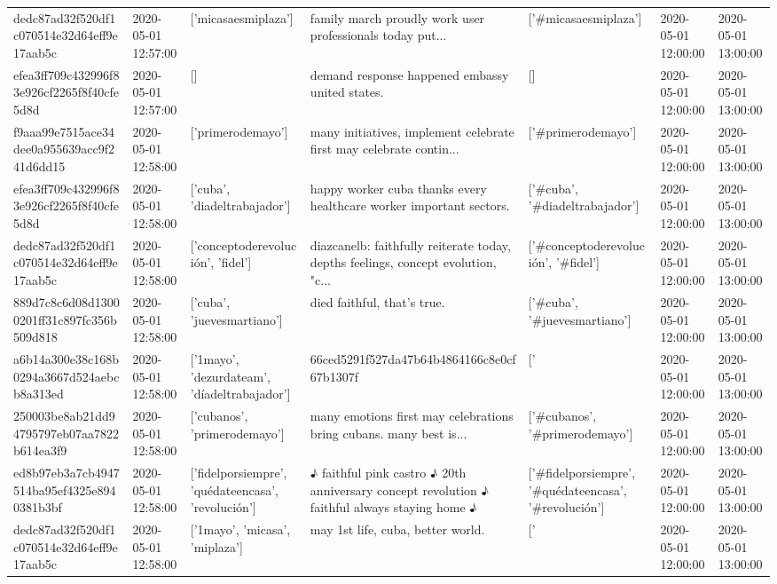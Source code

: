 \begin{tabular}{lllllll}
dedc87ad32f520df1c070514e32d64eff9e17aab5c & 2020-05-01 12:57:00 & ['micasaesmiplaza'] & family march proudly work user professionals today put... & ['#micasaesmiplaza'] & 2020-05-01 12:00:00 & 2020-05-01 13:00:00 \\
efea3ff709c432996f83e926cf2265f8f40cfe5d8d & 2020-05-01 12:57:00 & [] & demand response happened embassy united states. & [] & 2020-05-01 12:00:00 & 2020-05-01 13:00:00 \\
f9aaa99e7515ace34dee0a955639acc9f241d6dd15 & 2020-05-01 12:58:00 & ['primerodemayo'] & many initiatives, implement celebrate first may celebrate contin... & ['#primerodemayo'] & 2020-05-01 12:00:00 & 2020-05-01 13:00:00 \\
efea3ff709c432996f83e926cf2265f8f40cfe5d8d & 2020-05-01 12:58:00 & ['cuba', 'diadeltrabajador'] & happy worker cuba thanks every healthcare worker important sectors. & ['#cuba', '#diadeltrabajador'] & 2020-05-01 12:00:00 & 2020-05-01 13:00:00 \\
dedc87ad32f520df1c070514e32d64eff9e17aab5c & 2020-05-01 12:58:00 & ['conceptoderevolución', 'fidel'] & diazcanelb: faithfully reiterate today, depths feelings, concept evolution, "c... & ['#conceptoderevolución', '#fidel'] & 2020-05-01 12:00:00 & 2020-05-01 13:00:00 \\
889d7c8c6d08d13000201ff31c897fc356b509d818 & 2020-05-01 12:58:00 & ['cuba', 'juevesmartiano'] & died faithful, that's true. & ['#cuba', '#juevesmartiano'] & 2020-05-01 12:00:00 & 2020-05-01 13:00:00 \\
a6b14a300e38c168b0294a3667d524aebcb8a313ed & 2020-05-01 12:58:00 & ['1mayo', 'dezurdateam', 'díadeltrabajador'] & 66ced5291f527da47b64b4864166c8e0cf67b1307f & ['#1mayo', '#dezurdateam', '#díadeltrabajador'] & 2020-05-01 12:00:00 & 2020-05-01 13:00:00 \\
250003be8ab21dd94795797eb07aa7822b614ea3f9 & 2020-05-01 12:58:00 & ['cubanos', 'primerodemayo'] & many emotions first may celebrations bring cubans. many best is... & ['#cubanos', '#primerodemayo'] & 2020-05-01 12:00:00 & 2020-05-01 13:00:00 \\
ed8b97eb3a7cb4947514ba95ef4325e8940381b3bf & 2020-05-01 12:58:00 & ['fidelporsiempre', 'quédateencasa', 'revolución'] & ♪ faithful pink castro ♪ 20th anniversary concept revolution ♪ faithful always staying home ♪ & ['#fidelporsiempre', '#quédateencasa', '#revolución'] & 2020-05-01 12:00:00 & 2020-05-01 13:00:00 \\
dedc87ad32f520df1c070514e32d64eff9e17aab5c & 2020-05-01 12:58:00 & ['1mayo', 'micasa', 'miplaza'] & may 1st life, cuba, better world. & ['#1mayo', '#micasa', '#miplaza'] & 2020-05-01 12:00:00 & 2020-05-01 13:00:00 \\

\end{tabular}

